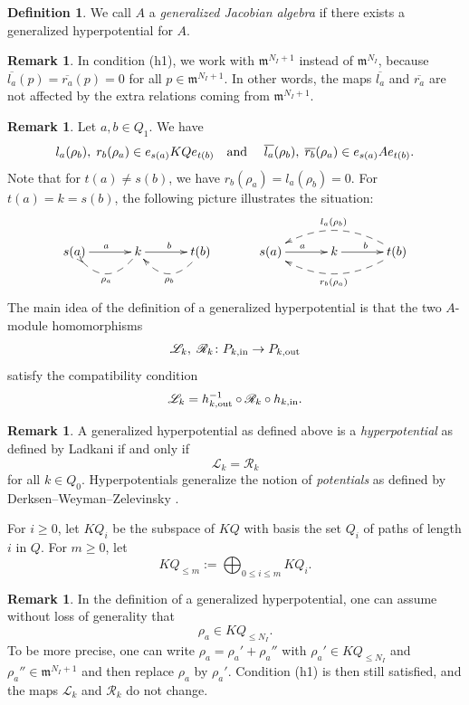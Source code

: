 \documentclass[12pt,reqno]{amsart}
\theoremstyle{definition}
\newtheorem{Rem}[Thm]{Remark}
\newtheorem{Def}[Thm]{Definition}
\newcommand{\df}{\colon}
\newcommand{\scL}{{\mathscr L}}
\newcommand{\scR}{{\mathscr R}}
\newcommand{\m}{\mathfrak{m}}
\newcommand{\ov}{\overline}
\begin{document}
\begin{Def}\label{def:genjacobian}
We call $A$ a \emph{generalized Jacobian algebra} if there exists
a generalized hyperpotential for $A$. 
\end{Def}

\begin{Rem}
In condition (h1), we work with $\m^{N_I+1}$ instead of $\m^{N_I}$, because 
$\overline{l_a}(p) = \overline{r_a}(p) = 0$ for all $p \in \m^{N_I+1}$.
In other words, the maps $\ov{l_a}$ and $\ov{r_a}$ are not affected by the extra relations coming from $\m^{N_I+1}$.
\end{Rem}

\begin{Rem}
Let $a,b \in Q_1$.
We have
$$
l_a(\rho_b),\; r_b(\rho_a)
\in
e_{s(a)}KQe_{t(b)}
\text{\quad and \quad}
\overline{l_a}(\rho_b),\; 
\overline{r_b}(\rho_a)
\in
e_{s(a)} A e_{t(b)}. 
$$
Note that for
$t(a) \not= s(b)$, we have
$r_b(\rho_a) = l_a(\rho_b) = 0$.
For
$t(a) = k = s(b)$,
the following picture illustrates the situation:
$$
\xymatrix@+2ex{
s(a) \ar[r]^a 
& k \ar[r]^b \ar@{-->}@/^4ex/[l]^{\rho_a}
& t(b) \ar@{-->}@/^4ex/[l]^{\rho_b}
&
s(a) \ar[r]^a & k \ar[r]^b
& t(b) \ar@{-->}@/^4ex/[ll]^{r_b(\rho_a)}
\ar@{-->}@/_4ex/[ll]_{l_a(\rho_b)}
}
$$
The main idea of the definition of a generalized hyperpotential
is that the two $A$-module homomorphisms
$$
\scL_k,\;
\scR_k\df P_{k,{\rm in}}\to P_{k,{\rm out}}
$$
satisfy the compatibility condition 
$$
\scL_k = h_{k,{\rm out}}^{-1} \circ \scR_k \circ h_{k,{\rm in}}.
$$
\end{Rem}

\begin{Rem}
A generalized hyperpotential as defined above is a
\emph{hyperpotential} as defined by Ladkani \cite{L14}
if and only if
$$
\scL_k = \scR_k
$$
for all $k \in Q_0$.
Hyperpotentials generalize the notion of \emph{potentials} as defined by Derksen--Weyman--Zelevinsky \cite{DWZ08,DWZ10}.
\end{Rem}

For $i \ge 0$, let $KQ_i$ be the subspace of $KQ$ with basis
the set $Q_i$ of paths of length $i$ in $Q$.
For $m \ge 0$, let
$$
KQ_{\le m} := \bigoplus_{0 \le i \le m} KQ_i.
$$

\begin{Rem}
In the definition of a generalized hyperpotential, one can assume without loss of generality that $$\rho_a \in KQ_{\le N_I}.$$
To be more precise, one can 
write $\rho_a = \rho_a' + \rho_a''$ with
$\rho_a' \in KQ_{\le N_I}$ and $\rho_a'' \in \m^{N_I+1}$
and then replace $\rho_a$ by $\rho_a'$. 
Condition (h1) is then still satisfied, and the maps $\scL_k$ and 
$\scR_k$ do not change.
\end{Rem}
\end{document}
